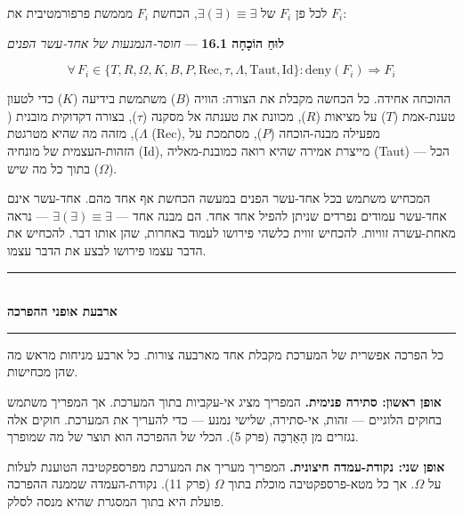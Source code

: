 \documentclass[10pt, openany, oneside]{book}
\renewcommand{\normalsize}{\fontsize{10}{13}\selectfont}
\begin{document}
\noindent לכל פן $F_i$ של $\exists(\exists) \equiv \exists$, הכחשת $F_i$ מממשת פרפורמטיבית את $F_i$:

\vspace{0.5em}

\textbf{לוּחַ הוֹכָחָה 16.1} --- \textit{חוסר-הנמנעות של אחד-עשר הפנים}

\vspace{0.5em}

$$\forall\, F_i \in \{T, R, \Omega, K, B, P, \text{Rec}, \tau, \Lambda, \text{Taut}, \text{Id}\}: \text{deny}(F_i) \Rightarrow F_i$$

ההוכחה אחידה. כל הכחשה מקבלת את הצורה: הוויה ($B$) משתמשת בידיעה ($K$) כדי לטעון טענת-אמת ($T$) על מציאות ($R$), מכוונת את טענתה אל מסקנה ($\tau$), בצורה דקדוקית מובנית ($\Lambda$), מזהה מה שהיא מטרגטת (Rec), מפעילה מבנה-הוכחה ($P$), מסתמכת על הזהות-העצמית של מונחיה (Id), מייצרת אמירה שהיא רואה כמובנת-מאליה (Taut) — הכל בתוך כל מה שיש ($\Omega$).

המכחיש משתמש בכל אחד-עשר הפנים במעשה הכחשת אף אחד מהם. אחד-עשר אינם אחד-עשר עמודים נפרדים שניתן להפיל אחד אחד. הם מבנה אחד — $\exists(\exists) \equiv \exists$ — נראה מאחת-עשרה זוויות. להכחיש זווית כלשהי פירושו לעמוד באחרות, שהן אותו דבר. להכחיש את הדבר עצמו פירושו לבצע את הדבר עצמו.

\vspace{1.5em}


\begin{center}
    \rule{0.3\textwidth}{0.4pt}\\[0.5em]
    {\normalsize\bfseries\textsc{ארבעת אופני ההפרכה}}\\[0.3em]
    \rule{0.3\textwidth}{0.4pt}
\end{center}

\vspace{1em}

\noindent כל הפרכה אפשרית של המערכת מקבלת אחד מארבעה צורות. כל ארבע מניחות מראש מה שהן מכחישות.

\textbf{אופן ראשון: סתירה פנימית.} המפריך מציג אי-עקביות בתוך המערכת. אך המפריך משתמש בחוקים הלוגיים — זהות, אי-סתירה, שלישי נמנע — כדי להעריך את המערכת. חוקים אלה נגזרים מן הָאַרְכֵּה (פרק 5). הכלי של ההפרכה הוא תוצר של מה שמופרך.

\textbf{אופן שני: נקודת-עמדה חיצונית.} המפריך מעריך את המערכת מפרספקטיבה הטוענת לעלות על $\Omega$. אך כל מטא-פרספקטיבה מוכלת בתוך $\Omega$ (פרק 11). נקודת-העמדה שממנה ההפרכה פועלת היא בתוך המסגרת שהיא מנסה לסלק.
\end{document}
